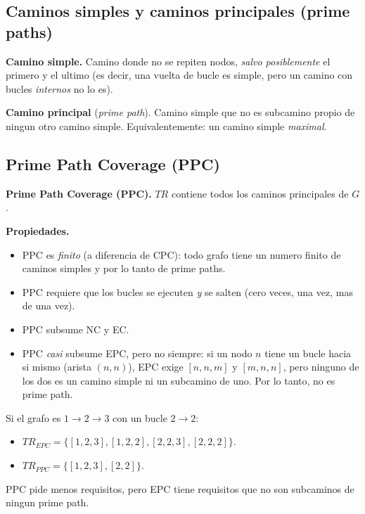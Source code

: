 \documentclass[12pt,a4paper]{article}
\begin{document}
\subsection{Caminos simples y caminos principales (prime paths)}

\begin{definicionbox}
\textbf{Camino simple.} Camino donde no se repiten nodos, \emph{salvo posiblemente} el primero y
el ultimo (es decir, una vuelta de bucle es simple, pero un camino con bucles \emph{internos} no
lo es).

\textbf{Camino principal} (\textit{prime path}). Camino simple que no es subcamino propio de
ningun otro camino simple. Equivalentemente: un camino simple \emph{maximal}.
\end{definicionbox}

\subsection{Prime Path Coverage (PPC)}

\begin{definicionbox}
\textbf{Prime Path Coverage (PPC).} $TR$ contiene todos los caminos principales de $G$.
\end{definicionbox}

\textbf{Propiedades.}
\begin{itemize}
  \item PPC es \emph{finito} (a diferencia de CPC): todo grafo tiene un numero finito de caminos
  simples y por lo tanto de prime paths.
  \item PPC requiere que los bucles se ejecuten \emph{y} se salten (cero veces, una vez, mas de
  una vez).
  \item PPC subsume NC y EC.
  \item PPC \emph{casi} subsume EPC, pero no siempre: si un nodo $n$ tiene un bucle hacia si
  mismo (arista $(n,n)$), EPC exige $[n,n,m]$ y $[m,n,n]$, pero ninguno de los dos es un camino
  simple ni un subcamino de uno. Por lo tanto, no es prime path.
\end{itemize}

\begin{ejemplobox}
Si el grafo es $1 \to 2 \to 3$ con un bucle $2 \to 2$:
\begin{itemize}
  \item $TR_{EPC} = \{[1,2,3], [1,2,2], [2,2,3], [2,2,2]\}$.
  \item $TR_{PPC} = \{[1,2,3], [2,2]\}$.
\end{itemize}
PPC pide menos requisitos, pero EPC tiene requisitos que no son subcaminos de ningun prime path.
\end{ejemplobox}
\end{document}
